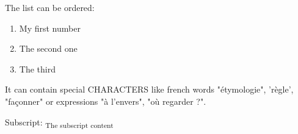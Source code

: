 \documentclass[letter,titlepage,oneside,11pt]{report}%
\begin{document}
\par%
\begin{FlushLeft}%
The list can be ordered:%
\end{FlushLeft}%
\begin{enumerate}%
\item My first number%
\item The second one%
\item The third%
\end{enumerate}%
\par%
\begin{FlushLeft}%
It can contain special CHARACTERS like french words "étymologie", 'règle', "façonner" or expressions "à l'envers", "où regarder ?".%
\end{FlushLeft}%
\par%
\begin{FlushLeft}%
Subscript: \textsubscript{The subscript content}%
\end{FlushLeft}%
\end{document}
